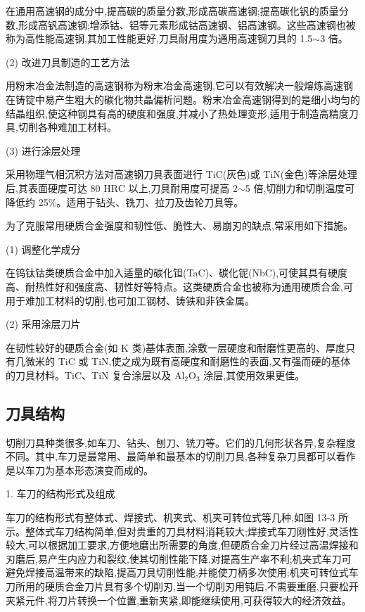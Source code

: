 \documentclass[UTF8]{ctexbook}
\newcommand{\◎}{\ensuremath{\bigcirc}}
\begin{document}
在通用高速钢的成分中,提高碳的质量分数,形成高碳高速钢;提高碳化钒的质量分数,形成高钒高速钢;增添钴、铝等元素形成钴高速钢、铝高速钢。这些高速钢也被称为高性能高速钢,其加工性能更好,刀具耐用度为通用高速钢刀具的 1.5$\sim$3 倍。

(2) 改进刀具制造的工艺方法

用粉末冶金法制造的高速钢称为粉末冶金高速钢,它可以有效解决一般熔炼高速钢在铸锭中易产生粗大的碳化物共晶偏析问题。粉末冶金高速钢得到的是细小均匀的结晶组织,使这种钢具有高的硬度和强度,并减小了热处理变形,适用于制造高精度刀具,切削各种难加工材料。

(3) 进行涂层处理

采用物理气相沉积方法对高速钢刀具表面进行 TiC(灰色)或 TiN(金色)等涂层处理后,其表面硬度可达 80 HRC 以上,刀具耐用度可提高 2$\sim$5 倍,切削力和切削温度可降低约 25\%。适用于钻头、铣刀、拉刀及齿轮刀具等。

为了克服常用硬质合金强度和韧性低、脆性大、易崩刃的缺点,常采用如下措施。

(1) 调整化学成分

在钨钛钴类硬质合金中加入适量的碳化钽(TaC)、碳化铌(NbC),可使其具有硬度高、耐热性好和强度高、韧性好等特点。这类硬质合金也被称为通用硬质合金,可用于难加工材料的切削,也可加工钢材、铸铁和非铁金属。

(2) 采用涂层刀片

在韧性较好的硬质合金(如 K 类)基体表面,涂敷一层硬度和耐磨性更高的、厚度只有几微米的 TiC 或 TiN,使之成为既有高硬度和耐磨性的表面,又有强而硬的基体的刀具材料。TiC、TiN 复合涂层以及 Al$_2$O$_3$ 涂层,其使用效果更佳。

\subsection{刀具结构}

切削刀具种类很多,如车刀、钻头、刨刀、铣刀等。它们的几何形状各异,复杂程度不同。其中,车刀是最常用、最简单和最基本的切削刀具,各种复杂刀具都可以看作是以车刀为基本形态演变而成的。

1. 车刀的结构形式及组成

车刀的结构形式有整体式、焊接式、机夹式、机夹可转位式等几种,如图 13-3 所示。整体式车刀结构简单,但对贵重的刀具材料消耗较大;焊接式车刀刚性好,灵活性较大,可以根据加工要求,方便地磨出所需要的角度,但硬质合金刀片经过高温焊接和刃磨后,易产生内应力和裂纹,使其切削性能下降,对提高生产率不利;机夹式车刀可避免焊接高温带来的缺陷,提高刀具切削性能,并能使刀柄多次使用;机夹可转位式车刀所用的硬质合金刀片具有多个切削刃,当一个切削刃用钝后,不需要重磨,只要松开夹紧元件,将刀片转换一个位置,重新夹紧,即能继续使用,可获得较大的经济效益。
\end{document}
